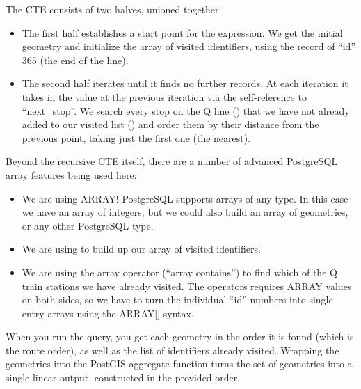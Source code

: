 \documentclass[a4paper,11pt,english]{sphinxmanual}
\begin{document}
The CTE consists of two halves, unioned together:
\begin{itemize}
\item {} 
The first half establishes a start point for the expression. We get the initial geometry and initialize the array of visited identifiers, using the record of “id” 365 (the end of the line).

\item {} 
The second half iterates until it finds no further records. At each iteration it takes in the value at the previous iteration via the self-reference to “next\_stop”. We search every stop on the Q line () that we have not already added to our visited list () and order them by their distance from the previous point, taking just the first one (the nearest).

\end{itemize}

Beyond the recursive CTE itself, there are a number of advanced PostgreSQL array features being used here:
\begin{itemize}
\item {} 
We are using ARRAY! PostgreSQL supports arrays of any type. In this case we have an array of integers, but we could also build an array of geometries, or any other PostgreSQL type.

\item {} 
We are using  to build up our array of visited identifiers.

\item {} 
We are using the  array operator (“array contains”) to find which of the Q train stations we have already visited. The  operators requires ARRAY values on both sides, so we have to turn the individual “id” numbers into single-entry arrays using the ARRAY{[}{]} syntax.

\end{itemize}

When you run the query, you get each geometry in the order it is found (which is the route order), as well as the list of identifiers already visited. Wrapping the geometries into the PostGIS  aggregate function turns the set of geometries into a single linear output, constructed in the provided order.
\end{document}
